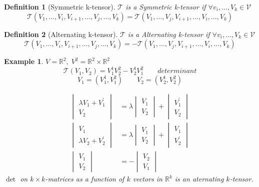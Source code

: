 \documentclass[12pt]{article}
\def\RR{\mathbb{R}}
\newtheorem{definition}{Definition}[section]
\newtheorem{example}{Example}[section]
\begin{document}
\begin{definition}[Symmetric k-tensor]
$\mathcal{T}$ is a Symmetric k-tensor if $\forall v_i , \dots , V_k \in \mathcal{V}$
\[\mathcal{T}(V_1, \dots , V_{i},V_{i+1} , \dots,  V_{j}, \dots , V_k) = \mathcal{T}(V_1, \dots , V_{j},V_{i+1} , \dots,  V_{i}, \dots , V_k)\]
\end{definition}

\begin{definition}[Alternating k-tensor]$\mathcal{T}$ is a Alternating k-tensor if $\forall v_i , \dots , V_k \in \mathcal{V}$
\[\mathcal{T}(V_1, \dots , V_{i},V_{i+1} , \dots,  V_{j}, \dots , V_k) = -\mathcal{T}(V_1, \dots , V_{j},V_{i+1} , \dots,  V_{i}, \dots , V_k)\]
\end{definition}

\begin{example} $V=\RR^2 , \; V^2 = \RR^2 \times \RR^2$
\[\mathcal{T}(V_1, V_2) = V_1^1V_2^2 - V_2^1V_1^2 \qquad \boxed{determinant}\]
\[V_1=(V_1^1, V_1^2) \qquad V_2=(V_2^1, V_2^2)\]

\begin{align*}
\begin{vmatrix} \lambda V_1 + V_1^{'} \\ V_2 \end{vmatrix} &= \lambda\begin{vmatrix} V_1 \\ V_2 \end{vmatrix} + \begin{vmatrix} V_1^{'} \\ V_2 \end{vmatrix} \\
\begin{vmatrix}  V_1\\ \lambda V_2 + V_2^{'} \end{vmatrix} &= \lambda\begin{vmatrix} V_1 \\ V_2 \end{vmatrix} + \begin{vmatrix} V_1 \\ V_2^{'} \end{vmatrix}\\
\begin{vmatrix} V_1 \\ V_2 \end{vmatrix} &= -\begin{vmatrix} V_2 \\ V_1 \end{vmatrix}
\end{align*}
$\det$ on $k\times k$-matrices as a function of $k$ vectors in $\RR^k$ is an aternating $k$-tensor. 
\end{example}
\end{document}
